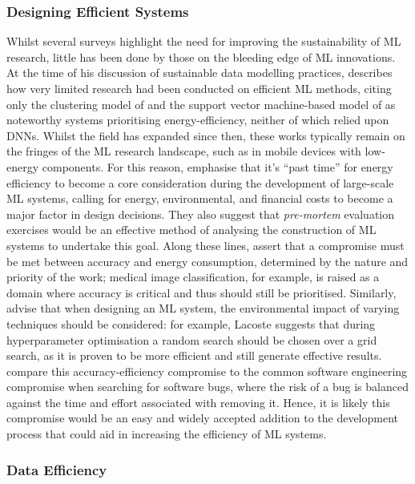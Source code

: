\documentclass[a4paper, 12pt]{article}
\begin{document}
    \subsubsection{Designing Efficient Systems}

    Whilst several surveys highlight the need for improving the sustainability of ML research, little has been done by those on the bleeding edge of ML innovations. At the time of his discussion of sustainable data modelling practices,  describes how very limited research had been conducted on efficient ML methods, citing only the clustering model of  and the support vector machine-based model of  as noteworthy systems prioritising energy-efficiency, neither of which relied upon DNNs. Whilst the field has expanded since then, these works typically remain on the fringes of the ML research landscape, such as in mobile devices with low-energy components. For this reason,  emphasise that it's ``past time” for energy efficiency to become a core consideration during the development of large-scale ML systems, calling for energy, environmental, and financial costs to become a major factor in design decisions. They also suggest that \emph{pre-mortem} evaluation exercises \cite{klein-2008} would be an effective method of analysing the construction of ML systems to undertake this goal. Along these lines,  assert that a compromise must be met between accuracy and energy consumption, determined by the nature and priority of the work; medical image classification, for example, is raised as a domain where accuracy is critical and thus should still be prioritised. Similarly,  advise that when designing an ML system, the environmental impact of varying techniques should be considered: for example, Lacoste suggests that during hyperparameter optimisation a random search should be chosen over a grid search, as it is proven to be more efficient and still generate effective results.  compare this accuracy-efficiency compromise to the common software engineering compromise when searching for software bugs, where the risk of a bug is balanced against the time and effort associated with removing it. Hence, it is likely this compromise would be an easy and widely accepted addition to the development process that could aid in increasing the efficiency of ML systems. 

    \subsubsection{Data Efficiency}
\end{document}

